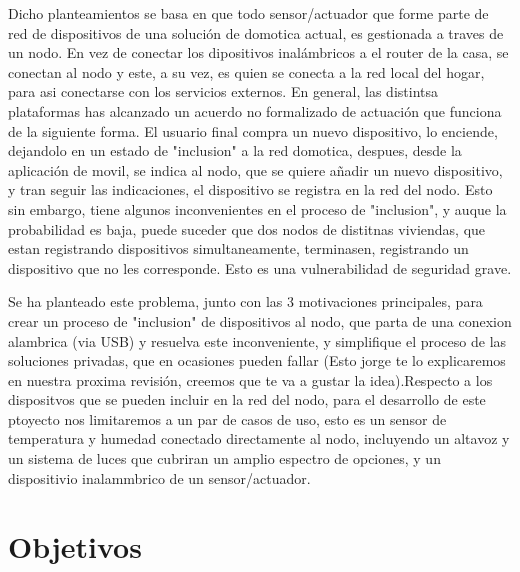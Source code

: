 Dicho planteamientos se basa en que todo sensor/actuador que forme parte de red de dispositivos de una solución de domotica actual, es gestionada a traves de un nodo. En vez de conectar los dipositivos inalámbricos a el router de la casa, se conectan al nodo y este, a su vez, es quien se conecta a la red local del hogar, para asi conectarse con los servicios externos. En general, las distintsa plataformas  has alcanzado un acuerdo no formalizado de actuación que funciona de la siguiente forma. El usuario final compra un nuevo dispositivo, lo enciende, dejandolo en un estado de "inclusion" a la red domotica, despues, desde la aplicación de movil, se indica al nodo, que se quiere añadir un nuevo dispositivo, y tran seguir las indicaciones, el dispositivo se registra en la red del nodo. Esto sin embargo, tiene algunos inconvenientes en el proceso de "inclusion", y auque la probabilidad es baja, puede suceder que dos nodos de distitnas viviendas, que estan registrando dispositivos simultaneamente, terminasen, registrando un dispositivo que no les corresponde. Esto es una vulnerabilidad de seguridad grave.

Se ha planteado este problema, junto con las 3 motivaciones principales, para crear un proceso de "inclusion" de dispositivos al nodo, que parta de una conexion alambrica (via USB) y resuelva este inconveniente, y simplifique el proceso de las soluciones privadas, que en ocasiones pueden fallar (Esto jorge te lo explicaremos en nuestra proxima revisión, creemos que te va a gustar la idea).Respecto a los dispositvos que se pueden incluir en la red del nodo, para el desarrollo de este ptoyecto nos limitaremos a un par de casos de uso, esto es un sensor de temperatura y humedad conectado directamente al nodo, incluyendo un altavoz y un sistema de luces que cubriran un amplio espectro de opciones, y un dispositivio inalammbrico de un sensor/actuador.

\section{Objetivos}
\label{ch:Capitulo1.2}

